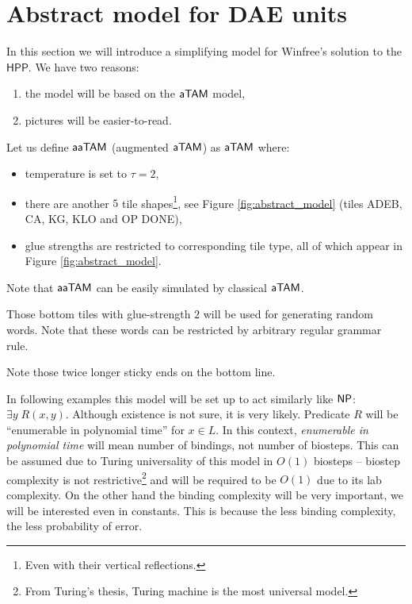 \section{Abstract model for DAE units}

In this section we will introduce a simplifying model for Winfree's solution to the $\mathsf{HPP}$. We have two reasons:
\begin{enumerate}   %
	\item the model will be based on the $\mathsf{aTAM}$ model,
	\item pictures will be easier-to-read.
\end{enumerate}

\begin{defn}
	Let us define $\mathsf{aaTAM}$ (augmented $\mathsf{aTAM}$) as $\mathsf{aTAM}$ where:
	\begin{itemize}
		\item temperature is set to $\tau = 2$,
		\item there are another $5$ tile shapes\footnote{Even with their vertical reflections.}, see Figure \ref{fig:abstract_model} (tiles {\sf ADEB}, {\sf CA}, {\sf KG}, {\sf KLO} and {\sf OP DONE}),
		\item glue strengths are restricted to corresponding tile type, all of which appear in Figure \ref{fig:abstract_model}.
	\end{itemize}
\end{defn}

\begin{note}
	Note that $\mathsf{aaTAM}$ can be easily simulated by classical $\mathsf{aTAM}$.
\end{note}


\begin{remark}   %
	Those bottom tiles with glue-strength $2$ will be used for generating random words. Note that these words can be restricted by arbitrary regular grammar rule.
\end{remark}


Note those twice longer sticky ends on the bottom line.

In following examples this model will be set up to act similarly like $\mathsf{NP}$: $\exists y \; R(x,y)$. Although existence is not sure, it is very likely. Predicate $R$ will be ``enumerable in polynomial time'' for $x \in L$. In this context, {\em enumerable in polynomial time} will mean number of bindings, not number of biosteps. This can be assumed due to Turing universality of this model in $O(1)$ biosteps -- biostep complexity is not restrictive\footnote{From Turing's thesis, Turing machine is the most universal model.} and will be required to be $O(1)$ due to its lab complexity. On the other hand the binding complexity will be very important, we will be interested even in constants. This is because the less binding complexity, the less probability of error.

